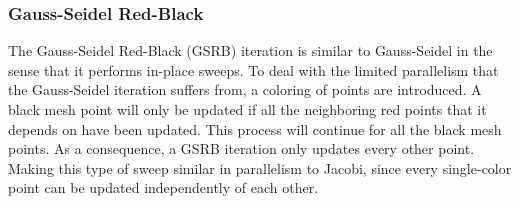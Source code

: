 \subsubsection{Gauss-Seidel Red-Black}
The Gauss-Seidel Red-Black (GSRB) iteration is similar to Gauss-Seidel in the sense that it performs in-place sweeps. To deal with the limited parallelism that the Gauss-Seidel iteration suffers from, a coloring of points are introduced. A black mesh point will only be updated if all the neighboring red points that it depends on have been updated. This process will continue for all the black mesh points. As a consequence, a GSRB iteration only updates every other point. Making this type of sweep similar in parallelism to Jacobi, since every single-color point can be updated independently of each other.



















